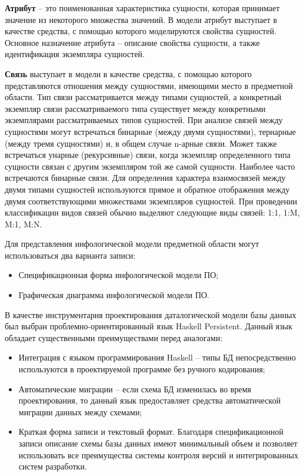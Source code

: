 \textbf{Атрибут} -- это поименованная характеристика сущности, которая принимает значение из некоторого множества значений. В модели атрибут выступает в качестве средства, с помощью которого моделируются свойства сущностей. Основное назначение атрибута – описание свойства сущности, а также идентификация экземпляра сущностей.

\textbf{Связь} выступает в модели в качестве средства, с помощью которого представляются отношения между сущностями, имеющими место в предметной области. Тип связи рассматривается между типами сущностей, а конкретный экземпляр связи рассматриваемого типа существует между конкретными экземплярами рассматриваемых типов сущностей. При анализе связей между сущностями могут встречаться бинарные (между двумя сущностями), тернарные (между тремя сущностями) и, в общем случае n-арные связи. Может также встречаться унарные (рекурсивные) связи, когда экземпляр определенного типа сущности связан с другим экземпляром той же самой сущности. Наиболее часто встречаются бинарные связи. Для определения характера взаимосвязей между двумя типами сущностей используются прямое и обратное отображения между двумя соответствующими множествами экземпляров сущностей. При проведении классификации видов связей обычно выделяют следующие виды связей: 1:1, 1:M, M:1, M:N.

Для представления инфологической модели предметной области могут использоваться два варианта записи:
\begin{itemize}
\item Спецификационная форма инфологической модели ПО;
\item Графическая диаграмма инфологической модели ПО.
\end{itemize}

В качестве инструментария проектирования даталогической модели базы данных был выбран проблемно-ориентированный язык Haskell Persistent. Данный язык обладает существенными преимуществами перед аналогами:
\begin{itemize}
\item Интеграция с языком программирования Haskell -- типы БД непосредственно используются в проектируемой программе без ручного кодирования;
\item Автоматические миграции -- если схема БД изменилась во время проектирования, то данный язык предоставляет средства автоматической миграции данных между схемами;
\item Краткая форма записи и текстовый формат. Благодаря спецификационной записи описание схемы базы данных имеют минимальный объем и позволяет использовать все преимущества системы контроля версий и интегрированных систем разработки.
\end{itemize}

